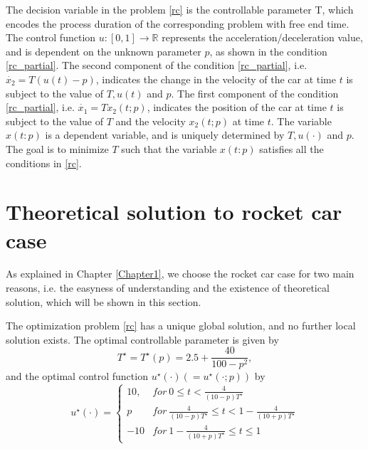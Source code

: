 \documentclass  [
  paper    = a4,
  BCOR     = 10mm,
  twoside,
  fontsize = 12pt,
  fleqn,
  toc      = bibnumbered,
  toc      = listofnumbered,
  numbers  = noendperiod,
  headings = normal,
  listof   = leveldown,
  version  = 3.03
]                                       {scrreprt}
\newcommand{\<}{\langle}
\renewcommand{\>}{\rangle}
\begin{document}
   The decision variable in the problem \ref{rc} is the controllable parameter T, which encodes the process duration of the corresponding problem with free end time. The control function $ u: [0,1] \rightarrow \mathbb{R}$ represents the acceleration/deceleration value, and is dependent on the unknown parameter $p$, as shown in the condition \ref{rc_partial}. The second component of the condition \ref{rc_partial}, i.e. $\dot{x_2} = T (u(t)-p)$, indicates the change in the velocity of the car at time $t$ is subject to the value of $T, u(t)$ and $p$. The first component of the condition \ref{rc_partial}, i.e. $\dot{x_1} = Tx_2(t;p)$, indicates the position of the car at time $t$ is subject to the value of $T$ and the velocity $x_2(t;p)$ at time $t$. The variable $x(t:p)$ is a dependent variable, and is uniquely determined by $T, u(\cdot)$ and $p$. The goal is to minimize $T$ such that the variable $x(t:p)$ satisfies all the conditions in \ref{rc}. 
   
   \section{Theoretical solution to rocket car case}
   As explained in Chapter \ref{Chapter1}, we choose the rocket car case for two main reasons, i.e. the easyness of understanding and the existence of theoretical solution, which will be shown in this section. 
   
   
   
   The optimization problem \ref{rc} has a unique global solution, and no further local solution exists. The optimal controllable parameter is given by 
   \begin{equation}
   T^\star = T^\star(p) = 2.5 + \frac{40}{100-p^2},
   \end{equation}
   and the optimal control function $u^\star(\cdot) (= u^\star(\cdot; p))$ by 
   \begin{equation}
   u^\star(\cdot) =     \left\{
   \begin{array}{ll}
   10, & for \  0 \leq t <  \frac{4}{(10-p)T^\star}\\
   p  &  for \ \frac{4}{(10-p)T^\star} \leq t < 1- \frac{4}{(10+p)T^\star} \\
   -10  & for \  1- \frac{4}{(10+p)T^\star} \leq t \leq 1 
   \end{array}
   \right.
   \end{equation}
   
\end{document}
